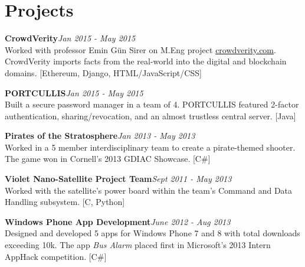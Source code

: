 \documentclass[11pt,letterpaper,sans]{moderncv}
\newenvironment{pzentry}[3]
{\textbf{#1}\notblank{#2}{\textit{~- #2}}{}\hfill\textit{#3}\\\normalsize}
{\bigskip}
\begin{document}
\section{Projects} %

\begin{pzentry}{CrowdVerity}{}{Jan 2015 - May 2015}
Worked with professor Emin G\"{u}n Sirer on M.Eng project \href{http://crowdverity.com/}{crowdverity.com}.
CrowdVerity imports facts from the real-world into the digital and blockchain domains.
[Ethereum, Django, HTML/JavaScript/CSS]
\end{pzentry}

\begin{pzentry}{PORTCULLIS}{}{Jan 2015 - May 2015}
Built a secure password manager in a team of 4.
PORTCULLIS featured 2-factor authentication, sharing/revocation, and an almost trustless central server.
[Java]
\end{pzentry}

\begin{pzentry}{Pirates of the Stratosphere}{}{Jan 2013 - May 2013}
Worked in a 5 member interdisciplinary team to create a pirate-themed shooter.
The game won in Cornell's 2013 GDIAC Showcase.
[C\#]
\end{pzentry}


\begin{pzentry}{Violet Nano-Satellite Project Team}{}{Sept 2011 - May 2013}
Worked with the satellite's power board within the team's Command and Data Handling subsystem.
[C, Python]
\end{pzentry}

\begin{pzentry}{Windows Phone App Development}{}{June 2012 - Aug 2013}
Designed and developed 5 apps for Windows Phone 7 and 8 with total downloads exceeding 10k.
The app \emph{Bus Alarm} placed first in Microsoft's 2013 Intern AppHack competition.
[C\#]
\end{pzentry}





\end{document}
